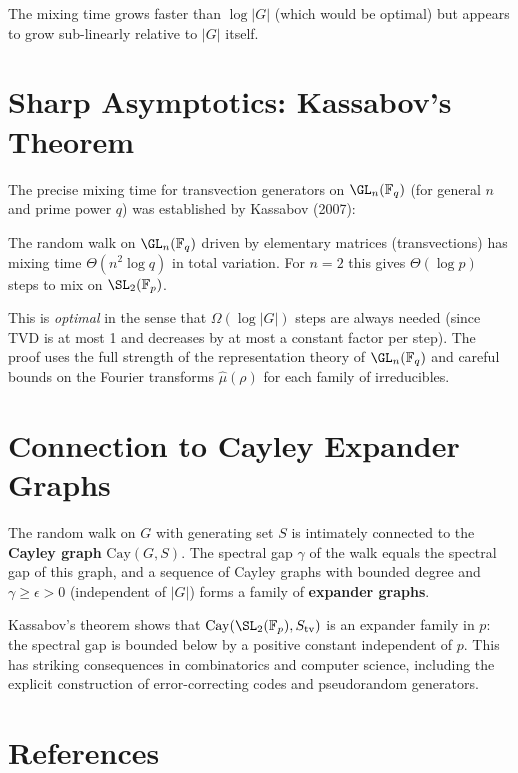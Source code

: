 The mixing time grows faster than $\log|G|$ (which would be optimal) but
appears to grow sub-linearly relative to $|G|$ itself.

\section{Sharp Asymptotics: Kassabov's Theorem}

The precise mixing time for transvection generators on $\GL_n(\mathbb{F}_q)$
(for general $n$ and prime power $q$) was established by Kassabov (2007):

\begin{theorem}[Kassabov 2007]
The random walk on $\GL_n(\mathbb{F}_q)$ driven by elementary matrices
(transvections) has mixing time $\Theta(n^2 \log q)$ in total variation.
For $n = 2$ this gives $\Theta(\log p)$ steps to mix on $\SL_2(\mathbb{F}_p)$.
\end{theorem}

This is \emph{optimal} in the sense that $\Omega(\log |G|)$ steps are always
needed (since TVD is at most 1 and decreases by at most a constant factor per step).
The proof uses the full strength of the representation theory of $\GL_n(\mathbb{F}_q)$
and careful bounds on the Fourier transforms $\hat\mu(\rho)$ for each family of
irreducibles.

\section{Connection to Cayley Expander Graphs}

The random walk on $G$ with generating set $S$ is intimately connected to the
\textbf{Cayley graph} $\mathrm{Cay}(G, S)$.
The spectral gap $\gamma$ of the walk equals the spectral gap of this graph,
and a sequence of Cayley graphs with bounded degree and $\gamma \geq \epsilon > 0$
(independent of $|G|$) forms a family of \textbf{expander graphs}.

Kassabov's theorem shows that $\mathrm{Cay}(\SL_2(\mathbb{F}_p), S_{\mathrm{tv}})$
is an expander family in $p$: the spectral gap is bounded below by a positive
constant independent of $p$.
This has striking consequences in combinatorics and computer science, including
the explicit construction of error-correcting codes and pseudorandom generators.

\section*{References}


